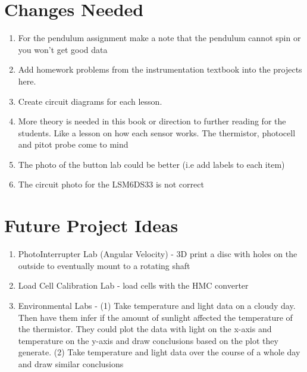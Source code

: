 \section{Changes Needed}
\begin{enumerate}[itemsep=-5pt]
\item For the pendulum assignment make a note that the pendulum cannot spin or you won't get good data
\item Add homework problems from the instrumentation textbook into the projects here. 
\item Create circuit diagrams for each lesson.
\item More theory is needed in this book or direction to further
  reading for the students. Like a lesson on how each sensor works. The thermistor, photocell and pitot probe come to mind
\item The photo of the button lab could be better (i.e add labels to
  each item)
\item The circuit photo for the LSM6DS33 is not correct
\end{enumerate}

\section{Future Project Ideas}
\begin{enumerate}[itemsep=-5pt]
\item PhotoInterrupter Lab (Angular Velocity) - 3D print a disc with holes on the outside to eventually mount to a rotating shaft  
\item Load Cell Calibration Lab - load cells with the HMC converter
\item Environmental Labs - (1) Take temperature and light data on a cloudy day. Then have them infer if the amount of sunlight affected the temperature of the thermistor. They could plot the data with light on the x-axis and temperature on the y-axis and draw conclusions based on the plot they generate. (2) Take temperature and light data over the course of a whole day and draw similar conclusions
\end{enumerate}
